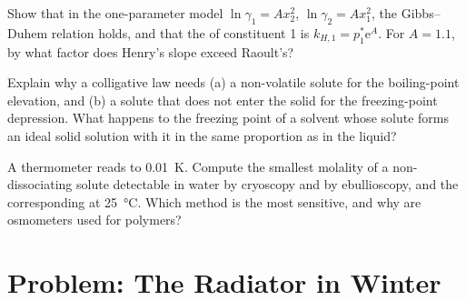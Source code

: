 \begin{exercise}[$\star\star\star$]\label{exo:b2:chemical-potential:10}
Show that in the one-parameter model $\ln\gamma_1 = Ax_2^2$, $\ln\gamma_2 =
Ax_1^2$, the Gibbs--Duhem relation holds, and that the  of
constituent 1 is $k_{H,1} = p_1^*\mathrm e^A$. For $A = 1.1$, by what factor
does Henry's slope exceed Raoult's?
\end{exercise}

\begin{exercise}[$\star\star\star$]\label{exo:b2:chemical-potential:11}
Explain why a colligative law needs (a) a non-volatile solute for the
boiling-point elevation, and (b) a solute that does not enter the solid for
the freezing-point depression. What happens to the freezing point of a
solvent whose solute forms an ideal solid solution with it in the same
proportion as in the liquid?
\end{exercise}

\begin{exercise}[$\star\star\star$]\label{exo:b2:chemical-potential:12}
A thermometer reads to \qty{0.01}{K}. Compute the smallest molality of a
non-dissociating solute detectable in water by cryoscopy and by
ebullioscopy, and the corresponding  at \qty{25}{\celsius}.
Which method is the most sensitive, and why are osmometers used for polymers?
\end{exercise}

\section{Problem: The Radiator in Winter}

